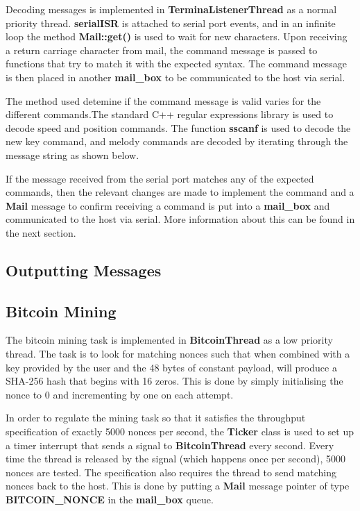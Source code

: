 \documentclass{article}
\begin{document}
Decoding messages is implemented in \textbf{TerminaListenerThread} as a normal priority thread. \textbf{serialISR} is attached to serial port events, and in an infinite loop the method \textbf{Mail::get()} is used to wait for new characters. Upon receiving a return carriage character from mail, the command message is passed to functions that try to match it with the expected syntax. The command message is then placed in another \textbf{mail\_box} to be communicated to the host via serial.

\bigskip
   
\bigskip       

The method used detemine if the command message is valid varies for the different commands.The standard C++ regular expressions library is used to decode speed and position commands. The function \textbf{sscanf} is used to decode the new key command, and melody commands are decoded by iterating through the message string as shown below.

\bigskip
  
\bigskip
If the message received from the serial port matches any of the expected commands, then the relevant changes are made to implement the command and a \textbf{Mail} message to confirm receiving a command is put into a \textbf{mail\_box} and communicated to the host via serial. More information about this can be found in the next section.


\subsection{Outputting Messages}

\subsection{Bitcoin Mining}

The bitcoin mining task is implemented in \textbf{BitcoinThread} as a low priority thread. The task is to look for matching nonces such that when combined with a key provided by the user and the 48 bytes of constant payload, will produce a SHA-256 hash that begins with 16 zeros. This is done by simply initialising the nonce to 0 and incrementing by one on each attempt. 

\bigskip

In order to regulate the mining task so that it satisfies the throughput specification of exactly 5000 nonces per second, the \textbf{Ticker} class is used to set up a timer interrupt that sends a signal to \textbf{BitcoinThread} every second. Every time the thread is released by the signal (which happens once per second), 5000 nonces are tested. The specification also requires the thread to send matching nonces back to the host. This is done by putting a \textbf{Mail} message pointer of type \textbf{BITCOIN\_NONCE} in the \textbf{mail\_box} queue. 
\end{document}
